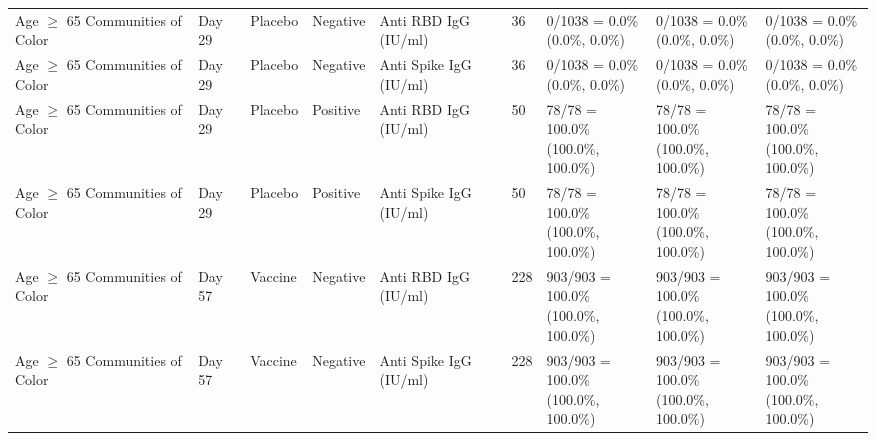 \documentclass[]{book}
\theoremstyle{definition}
\theoremstyle{definition}
\theoremstyle{definition}
\newcommand{\1}{\mathbbm{1}}
\begin{document}
\begin{landscape}
\begin{ThreePartTable}
\begin{longtable}[t]{>{\raggedright\arraybackslash}p{2.7cm}llllllll}
\hspace{1em}Age $\geq$ 65 Communities of Color & Day 29 & Placebo & Negative & Anti RBD IgG (IU/ml) & 36 & \makecell[l]{0/1038 = 0.0\%\\(0.0\%, 0.0\%)} & \makecell[l]{0/1038 = 0.0\%\\(0.0\%, 0.0\%)} & \makecell[l]{0/1038 = 0.0\%\\(0.0\%, 0.0\%)}\\
\hspace{1em}Age $\geq$ 65 Communities of Color & Day 29 & Placebo & Negative & Anti Spike IgG (IU/ml) & 36 & \makecell[l]{0/1038 = 0.0\%\\(0.0\%, 0.0\%)} & \makecell[l]{0/1038 = 0.0\%\\(0.0\%, 0.0\%)} & \makecell[l]{0/1038 = 0.0\%\\(0.0\%, 0.0\%)}\\
\hspace{1em}Age $\geq$ 65 Communities of Color & Day 29 & Placebo & Positive & Anti RBD IgG (IU/ml) & 50 & \makecell[l]{78/78 = 100.0\%\\(100.0\%, 100.0\%)} & \makecell[l]{78/78 = 100.0\%\\(100.0\%, 100.0\%)} & \makecell[l]{78/78 = 100.0\%\\(100.0\%, 100.0\%)}\\
\hspace{1em}Age $\geq$ 65 Communities of Color & Day 29 & Placebo & Positive & Anti Spike IgG (IU/ml) & 50 & \makecell[l]{78/78 = 100.0\%\\(100.0\%, 100.0\%)} & \makecell[l]{78/78 = 100.0\%\\(100.0\%, 100.0\%)} & \makecell[l]{78/78 = 100.0\%\\(100.0\%, 100.0\%)}\\
\hspace{1em}Age $\geq$ 65 Communities of Color & Day 57 & Vaccine & Negative & Anti RBD IgG (IU/ml) & 228 & \makecell[l]{903/903 = 100.0\%\\(100.0\%, 100.0\%)} & \makecell[l]{903/903 = 100.0\%\\(100.0\%, 100.0\%)} & \makecell[l]{903/903 = 100.0\%\\(100.0\%, 100.0\%)}\\
\hspace{1em}Age $\geq$ 65 Communities of Color & Day 57 & Vaccine & Negative & Anti Spike IgG (IU/ml) & 228 & \makecell[l]{903/903 = 100.0\%\\(100.0\%, 100.0\%)} & \makecell[l]{903/903 = 100.0\%\\(100.0\%, 100.0\%)} & \makecell[l]{903/903 = 100.0\%\\(100.0\%, 100.0\%)}\\

\end{longtable}
\end{ThreePartTable}
\end{landscape}
\end{document}

